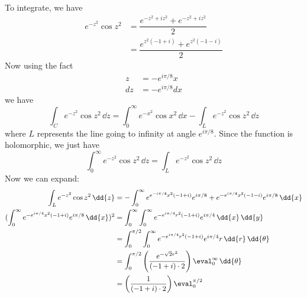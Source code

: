 \documentclass{article}
\begin{document}
\begin{answer}
        To integrate, we have
            \begin{align*}
                e^{-z^{2}}\cos{z^{2}} &= \dfrac{e^{-z^{2} + iz^{2}} + e^{-z^{2} + iz^{2}}}{2} \\
                                      &= \dfrac{e^{z^{2}(-1 + i)} + e^{z^{2}(-1 - i)}}{2}       
            \end{align*}
        Now using the fact
            \begin{align*}
                z  &= -e^{i\pi/8}x   \\
                dz &= -e^{i\pi/8}d x   
            \end{align*}
        we have
            \begin{equation*}
                \int_{C}^{} e^{-z^{2}}\cos{z^{2}} \, \dd{z} = \int_{0}^{\infty} e^{-x^{2}}\cos{x^{2}} \, \dd{x}  - \int_{L}^{} e^{-z^{2}}\cos{z^{2}} \, \dd{z} 
            \end{equation*}
        where $L$ represents the line going to infinity at angle $e^{i\pi/8}$. Since the function is holomorphic, we just have
            \begin{equation*}
                \int_{0}^{\infty} e^{-z^{2}}\cos{z^{2}} \, \dd{z}  = \int_{L}^{} e^{-z^{2}}\cos{z^{2}} \, \dd{z} 
            \end{equation*}
        Now we can expand:
            \begin{align*}
                \int_{L}^{} e^{-z^{2}}\cos{z^{2}} \, \dd{z}                               &= -\int_{0}^{\infty} e^{e^{-i\pi/4}x^{2}(-1 + i)}e^{i\pi/8} + e^{-e^{i\pi/4}x^{2}(-1 - i)}e^{i\pi/8} \, \dd{x}  \\
                (\int_{0}^{\infty} e^{-e^{i\pi/4}x^{2}(-1 + i)}e^{i\pi/8} \, \dd{x} )^{2} &= \int_{0}^{\infty} \int_{0}^{\infty} e^{-e^{i\pi/4}r^{2}(-1 + i)}e^{i\pi/4} \, \dd{x}  \, \dd{y}              \\
                                                                                          &= \int_{0}^{\pi/2} \int_{0}^{\infty} e^{-e^{i\pi/4}r^{2}(-1 + i)}e^{i\pi/4}r \, \dd{r}  \, \dd{\theta}         \\
                                                                                          &= \int_{0}^{\pi/2} \left(\dfrac{e^{-\sqrt{2}r^{2}}}{(-1 + i) \cdot 2}\right)\eval_{0}^{\infty} \, \dd{\theta} 
                                                                                         \\
                                                                                         &= \left(\dfrac{1}{(-1 + i) \cdot 2}\right)\eval_{0}^{\pi/2} \\

\end{align*}
\end{answer}
\end{document}
